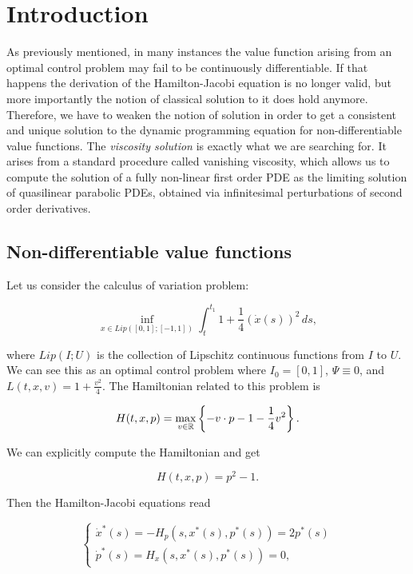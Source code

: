 \section{Introduction}

As previously mentioned, in many instances the value function arising from an optimal control problem may fail to be continuously 
differentiable. If that happens the derivation of the Hamilton-Jacobi equation is no longer valid, but more importantly 
the notion of classical solution to it does hold anymore. Therefore, we have to weaken the notion of solution in order to get 
a consistent and unique solution to the dynamic programming equation for non-differentiable value functions. The \textit{viscosity solution} 
is exactly what we are searching for. It arises from a standard procedure called vanishing viscosity, which allows us to compute the 
solution of a fully non-linear first order PDE as the limiting solution of quasilinear parabolic PDEs, obtained via infinitesimal 
perturbations of second order derivatives. 

\subsection{Non-differentiable value functions}\label{Non diff V}

Let us consider the calculus of variation problem:

\begin{equation}\label{Non diff V-problem}
    \inf_{x\in Lip([0,1];[-1,1])} \int_t^{t_1} 1 + \frac{1}{4}(\dot{x}(s))^2 \,ds,
\end{equation}

where $Lip(I;U)$ is the collection of Lipschitz continuous functions from $I$ to $U$. We can see this as an optimal control problem where $I_0=[0,1]$, $\Psi\equiv 0$, and $L(t,x,v) = 1+\frac{v^2}{4}$. The Hamiltonian related to 
this problem is

\[H(t,x,p) = \max_{v\in \mathbb{R}} \left\{-v\cdot p - 1 - \frac{1}{4}v^2\right\}.\]

We can explicitly compute the Hamiltonian and get

\[H(t,x,p)=p^2-1.\]

Then the Hamilton-Jacobi equations read

\[\begin{cases}
    \dot{x}^{\ast}(s) = -H_p(s,x^{\ast}(s),p^{\ast}(s)) =  2p^{\ast}(s)\\
    \dot{p}^{\ast}(s) = H_x(s,x^{\ast}(s),p^{\ast}(s)) = 0,
\end{cases}\]


